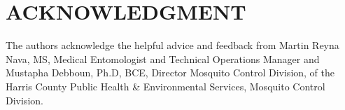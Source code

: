 \documentclass[letterpaper, 10 pt, conference]{ieeeconf}  %
\begin{document}









\section*{ACKNOWLEDGMENT}
The authors acknowledge the helpful advice and feedback from Martin Reyna Nava, MS, Medical Entomologist and Technical Operations Manager and Mustapha Debboun, Ph.D, BCE, Director Mosquito Control Division, of the Harris County Public Health \& Environmental Services, Mosquito Control Division.







%

%
%
%
%
%
%
\end{document}
